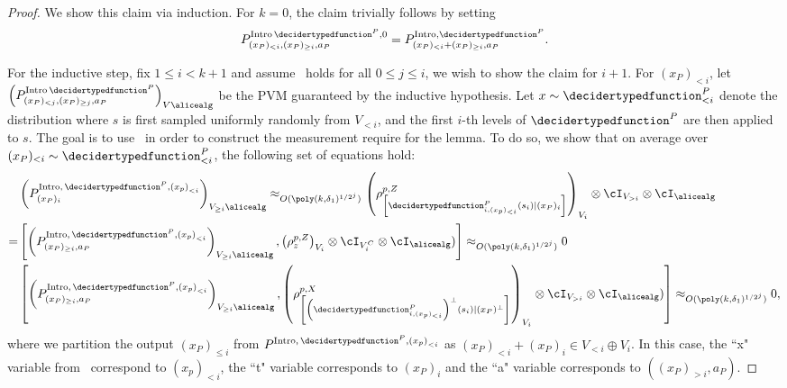 \begin{proof}
	We show this claim via induction. For $k = 0$, the claim trivially follows by setting 
	\begin{equation*}
		P^{\text{Intro} \, \decidertypedfunction^P, 0}_{(x_P)_{< i}, (x_P)_{\geq i}, a_P} = P^{\text{Intro}, \decidertypedfunction^P}_{(x_P)_{< i}+ (x_P)_{\geq i}, a_P}.
	\end{equation*}

	For the inductive step, fix $1 \leq i < k+1$ and assume~ holds for all $0 \leq j \leq i$, we wish to show the claim for $i+1$. For $(x_P)_{< i}$, let $\left(P^{\text{Intro} \, \decidertypedfunction^P}_{(x_P)_{< j}, (x_P)_{\geq j}, a_P}\right)_{V \alicealg}$ be the PVM guaranteed by the inductive hypothesis. Let $x \sim \decidertypedfunction^P_{< i}$ denote the distribution where $s$ is first sampled uniformly randomly from $V_{<i}$, and the first $i$-th levels of $ \decidertypedfunction^P$ are then applied to $s$. The goal is to use~ in order to construct the measurement require for the lemma. To do so, we show that on average over $(x_P)_{< i}  \sim \decidertypedfunction^P_{< i}$, the following set of equations hold:
	\begin{align}
		\label{eq:ARproofdecompIntro-1} &\left(P^{\text{Intro}, \, \decidertypedfunction^P, \left(x_p\right)_{< i}}_{(x_P)_{i}} \right)_{V_{\geq i} \alicealg} \approx_{O(\poly(k, \delta_1)^{1/2^j})} \left(\rho_{\left[\decidertypedfunction_{i, (x_p)_{< i}}^{P} (s_i) | (x_P)_i \right]}^{p, Z}\right)_{V_i} \otimes \cI_{V_{> i}} \otimes \cI_\alicealg \\
		=\label{eq:ARproofdecompIntro-2} &\left[\left(P^{\text{Intro}, \, \decidertypedfunction^P, \left(x_p\right)_{< i}}_{(x_P)_{\geq i}, a_P} \right)_{V_{\geq i} \alicealg},  \left(\rho_{z}^{p, Z}\right)_{V_i} \otimes \cI_{V_i^C} \otimes \cI_\alicealg)\right]\approx_{O(\poly(k, \delta_1)^{1/2^j})} 0 \\
		\label{eq:ARproofdecompIntro-3} &\left[\left(P^{\text{Intro}, \, \decidertypedfunction^P, \left(x_p\right)_{< i}}_{(x_P)_{\geq i}, a_P} \right)_{V_{\geq i} \alicealg} ,  \left(\rho_{\left[\left(\decidertypedfunction_{i, (x_p)_{< i}}^{P}\right)^{\bot} (s_i) | (x_P)^{\bot} \right]}^{p, X}\right)_{V_i} \otimes \cI_{V_{> i}} \otimes \cI_\alicealg) \right] \approx_{O(\poly(k, \delta_1)^{1/2^j})} 0, 
	\end{align}
	 where we partition the output $(x_P)_{\leq i}$ from $P^{\text{Intro}, \, \decidertypedfunction^P, \left(x_p\right)_{< i}}$ as $(x_P)_{< i} + (x_P)_{i} \in V_{< i} \oplus V_{i}$. In this case, the ``x" variable from~ correspond to $(x_p)_{< i}$, the ``t" variable corresponds to $(x_P)_i$ and the ``a" variable corresponds to $((x_P)_{> i}, a_P)$. 
	 

\end{proof}

